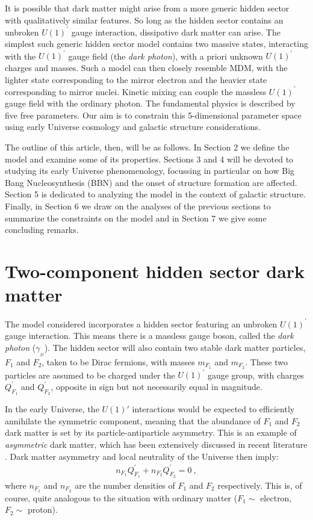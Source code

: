 \documentclass[12pt]{article}
\begin{document}
It is possible that dark matter might arise from a more generic hidden
sector with qualitatively similar features. So long as the hidden sector
contains an
unbroken $U(1) ^{'}$ gauge interaction, dissipative dark matter can
arise. The simplest such generic hidden sector model contains two
massive states,
interacting with the $U(1) ^{'}$ gauge field (the \textit{dark photon}),
with a priori unknown $U(1) ^{'}$ charges and masses. Such a model can
then closely
resemble MDM, with the lighter state corresponding to the mirror
electron and the heavier state corresponding to mirror nuclei. Kinetic
mixing can couple the
massless $U(1) ^{'}$ gauge field with the ordinary photon. The
fundamental physics is 
described by five free parameters. Our aim is to constrain this
5-dimensional parameter space using early Universe cosmology and
galactic structure considerations.

The outline of this article, then, will be as follows. In Section 2 we
define the model and examine some of its properties. Sections 3 and 4
will be devoted
to studying its early Universe phenomenology, focussing in particular on
how Big Bang Nucleosynthesis (BBN) and the onset of structure formation
are affected. Section 5 is dedicated to analyzing the model in the
context of galactic structure. Finally, in Section 6 we draw on the
analyses of the previous sections to summarize the constraints on the
model and in Section 7 we give some concluding remarks.

\section{Two-component hidden sector dark matter}

The model considered incorporates a hidden sector featuring an unbroken
$U(1) ^{'}$ gauge interaction. 
This means there is a massless gauge boson, called the
\textit{dark photon} ($\gamma _{_D}$). The hidden sector will also
contain two stable dark matter particles, $F_1$ and $F_2$, taken to be
Dirac fermions, with
masses $m _{F_1}$ and $m _{F_2}$. These two particles are assumed to be
charged under the $U(1) ^{'}$ gauge group, with charges $Q _{F_1} ^{'}$
and $Q _{F_2}
^{'}$, opposite in sign but not necessarily equal in magnitude.

In the early Universe, the $U(1)'$ interactions would be expected to
efficiently annihilate the symmetric component, meaning that the
abundance of $F_1$ and $F_2$ dark matter is set by its
particle-antiparticle asymmetry. This is an example of
\textit{asymmetric} dark matter, which has been extensively discussed in
recent literature \cite{reviewadm}. Dark matter asymmetry and local
neutrality of the Universe then imply:
%
\begin{eqnarray}
n _{F_1}Q _{F_1} ^{'} + n _{F_2}Q _{F_2} ^{'} = 0 \ ,
\end{eqnarray}
%
where $n _{F_1}$ and $n _{F_2}$ are the number densities of $F _1$ and
$F _2$ respectively. This is, of course, quite analogous to the
situation with ordinary matter ($F_1 \sim$ electron, $F_2 \sim$ proton).
\end{document}

